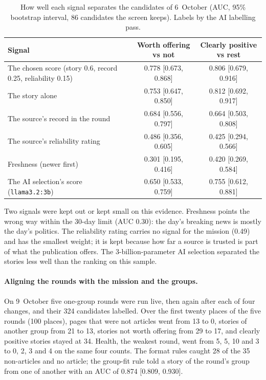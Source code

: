 \begin{table}[ht]
\centering
\small
\caption{How well each signal separates the candidates of 6~October
(AUC, 95\% bootstrap interval, 86 candidates the screen keeps). Labels
by the AI labelling pass.}
\label{tab:ranking-auc}
\begin{tabularx}{\linewidth}{@{}Xcc@{}}
\toprule
\textbf{Signal} & \textbf{Worth offering vs not} & \textbf{Clearly positive vs rest} \\
\midrule
The chosen score (story 0.6, record 0.25, reliability 0.15) & 0.778 [0.673, 0.868] & 0.806 [0.679, 0.916] \\
The story alone & 0.753 [0.647, 0.850] & 0.812 [0.692, 0.917] \\
The source's record in the round & 0.684 [0.556, 0.797] & 0.664 [0.503, 0.808] \\
The source's reliability rating & 0.486 [0.356, 0.605] & 0.425 [0.294, 0.566] \\
Freshness (newer first) & 0.301 [0.195, 0.416] & 0.420 [0.269, 0.584] \\
The AI selection's score (\texttt{llama3.2:3b}) & 0.650 [0.533, 0.759] & 0.755 [0.612, 0.881] \\
\bottomrule
\end{tabularx}
\end{table}

Two signals were kept out or kept small on this evidence. Freshness
points the wrong way within the 30-day limit (AUC 0.30): the day's
breaking news is mostly the day's politics. The reliability rating
carries no signal for the mission (0.49) and has the smallest weight;
it is kept because how far a source is trusted is part of what the
publication offers. The 3-billion-parameter AI selection separated the
stories less well than the ranking on this sample.

\paragraph{Aligning the rounds with the mission and the groups.} On
9~October five one-group rounds were run live, then again after each
of four changes, and their 324 candidates labelled. Over the first
twenty places of the five rounds (100 places), pages that were not
articles went from 13 to 0, stories of another group from 21 to 13,
stories not worth offering from 29 to 17, and clearly positive stories
stayed at 34. Health, the weakest round, went from 5, 5, 10 and 3 to 0,
2, 3 and 4 on the same four counts. The format rules caught 28 of the
35 non-articles and no article; the group-fit rule told a story of the
round's group from one of another with an AUC of 0.874 [0.809, 0.930].

